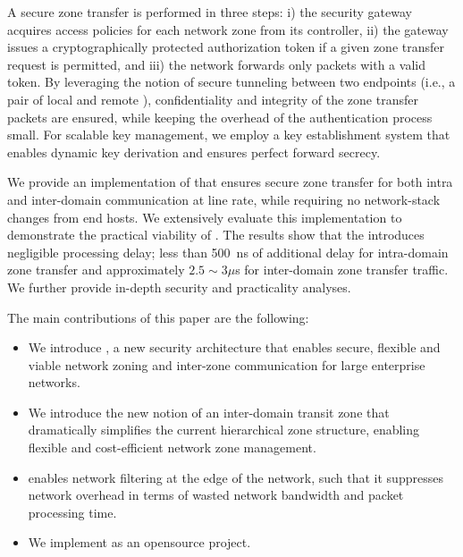 A secure zone transfer is performed in three steps: i) the security gateway acquires
access policies for each network zone from its controller, ii) the gateway issues a
cryptographically protected authorization token if a given zone transfer request is
permitted, and iii) the network forwards only packets with a valid token. By leveraging
the notion of secure tunneling between two endpoints (i.e., a pair of local and remote \tps),
confidentiality and integrity of the zone transfer packets are ensured, while keeping the overhead of
the authentication process small. For scalable key management,
we employ a key establishment system that enables dynamic key derivation
and ensures perfect forward secrecy.

We provide an implementation of \name that ensures secure zone transfer for
both intra and inter-domain communication at line rate, while requiring no network-stack
changes from end hosts. We extensively evaluate this implementation to demonstrate
the practical viability of \name. The results show that the \tp introduces negligible
processing delay; less than \SI{500}{ns} of additional delay for intra-domain zone transfer
and approximately $2.5 \sim 3 \mu$s for inter-domain zone transfer traffic. We further
provide in-depth security and practicality analyses.

The main contributions of this paper are the following:
\begin{itemize}
	\item We introduce \name, a new security architecture that enables secure, flexible
	      and viable network zoning and inter-zone communication for large enterprise
	      networks.
	\item We introduce the new notion of an inter-domain transit zone that dramatically
	      simplifies the current hierarchical zone structure, enabling flexible and cost-efficient
	      network zone management.
	\item \name enables network filtering at the edge of the network, such that it suppresses
	      network overhead in terms of wasted network bandwidth and packet processing time.
	\item We implement \name as an opensource project.
\end{itemize}

